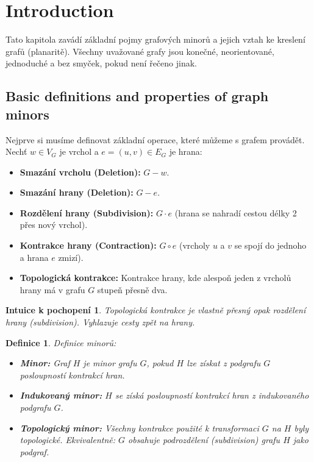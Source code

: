 \documentclass[a4paper,11pt]{article}
\newtheorem{definition}{Definice}[section]
\newtheorem*{intuition}{Intuice k pochopení}
\begin{document}
\section{Introduction}

Tato kapitola zavádí základní pojmy grafových minorů a jejich vztah ke kreslení grafů (planaritě). Všechny uvažované grafy jsou konečné, neorientované, jednoduché a bez smyček, pokud není řečeno jinak.

\subsection{Basic definitions and properties of graph minors}

Nejprve si musíme definovat základní operace, které můžeme s grafem provádět. Nechť $w \in V_G$ je vrchol a $e = (u,v) \in E_G$ je hrana:
\begin{itemize}
    \item \textbf{Smazání vrcholu (Deletion):} $G - w$.
    \item \textbf{Smazání hrany (Deletion):} $G - e$.
    \item \textbf{Rozdělení hrany (Subdivision):} $G \cdot e$ (hrana se nahradí cestou délky 2 přes nový vrchol).
    \item \textbf{Kontrakce hrany (Contraction):} $G \circ e$ (vrcholy $u$ a $v$ se spojí do jednoho a hrana $e$ zmizí).
    \item \textbf{Topologická kontrakce:} Kontrakce hrany, kde alespoň jeden z vrcholů hrany má v grafu $G$ stupeň přesně dva.
\end{itemize}

\begin{intuition}
Topologická kontrakce je vlastně přesný opak rozdělení hrany (subdivision). Vyhlazuje cesty zpět na hrany.
\end{intuition}

\begin{definition} Definice minorů:
\begin{itemize}
    \item \textbf{Minor:} Graf $H$ je minor grafu $G$, pokud $H$ lze získat z podgrafu $G$ posloupností kontrakcí hran.
    \item \textbf{Indukovaný minor:} $H$ se získá posloupností kontrakcí hran z \textit{indukovaného} podgrafu $G$.
    \item \textbf{Topologický minor:} Všechny kontrakce použité k transformaci $G$ na $H$ byly \textit{topologické}. Ekvivalentně: $G$ obsahuje podrozdělení (subdivision) grafu $H$ jako podgraf.
\end{itemize}
\end{definition}
\end{document}
